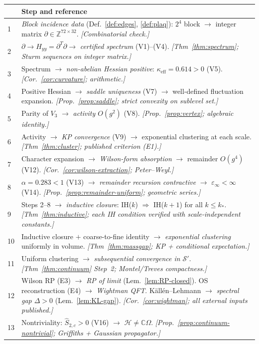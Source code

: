 \documentclass[11pt]{article}
\theoremstyle{definition}
\newcommand{\Z}{\mathbb{Z}}
\begin{document}
\begin{center}
\renewcommand{\arraystretch}{1.2}
\begin{tabular}{@{}p{0.5cm}p{12cm}@{}}
\toprule
& \textbf{Step and reference}\\
\midrule
1 & \emph{Block incidence data} (Def.~\ref{def:edges},
\ref{def:plaq}): $2^4$ block $\to$ integer matrix
$\partial\in\Z^{72\times 32}$. \emph{[Combinatorial check.]}\\
2 & $\partial\to H_{yy}=\partial^T\partial\to$
\emph{certified spectrum} (V1)--(V4).
\emph{[Thm~\ref{thm:spectrum}; Sturm sequences on
integer matrix.]}\\
3 & Spectrum $\to$ \emph{non-abelian Hessian positive}:
$\kappa_{\mathrm{eff}}=0.614>0$ (V5).
\emph{[Cor.~\ref{cor:curvature}; arithmetic.]}\\
4 & Positive Hessian $\to$ \emph{saddle uniqueness}
(V7) $\to$ well-defined fluctuation expansion.
\emph{[Prop.~\ref{prop:saddle}; strict convexity on
sublevel set.]}\\
5 & Parity of $V_3$ $\to$ \emph{activity $O(g^2)$}
(V8). \emph{[Prop.~\ref{prop:vertex}; algebraic
identity.]}\\
6 & Activity $\to$ \emph{KP convergence} (V9)
$\to$ exponential clustering at each scale.
\emph{[Thm~\ref{thm:cluster}; published criterion
(E1).]}\\
7 & Character expansion $\to$
\emph{Wilson-form absorption} $\to$ remainder $O(g^4)$
(V12). \emph{[Cor.~\ref{cor:wilson-extraction};
Peter--Weyl.]}\\
8 & $\alpha=0.283<1$ (V13) $\to$
\emph{remainder recursion contractive} $\to$
$\varepsilon_\infty<\infty$ (V14).
\emph{[Prop.~\ref{prop:remainder-uniform}; geometric
series.]}\\
9 & Steps 2--8 $\to$ \emph{inductive closure}:
IH($k$) $\Rightarrow$ IH($k+1$) for all $k\le k_*$.
\emph{[Thm~\ref{thm:inductive}; each IH condition
verified with scale-independent constants.]}\\
10 & Inductive closure $+$ coarse-to-fine identity
$\to$ \emph{exponential clustering} uniformly in volume.
\emph{[Thm~\ref{thm:massgap}; KP + conditional
expectation.]}\\
11 & Uniform clustering $\to$ \emph{subsequential
convergence in $\mathcal{S}'$}.
\emph{[Thm~\ref{thm:continuum} Step~2; Montel/Treves
compactness.]}\\
12 & Wilson RP (E3) $\to$ \emph{RP of limit}
(Lem.~\ref{lem:RP-closed}). OS reconstruction (E4) $\to$
\emph{Wightman QFT}. K\"all\'en--Lehmann $\to$
\emph{spectral gap $\Delta>0$}
(Lem.~\ref{lem:KL-gap}).
\emph{[Cor.~\ref{cor:wightman}; all external inputs
published.]}\\
13 & Nontriviality: $\hat S_{2,c}>0$ (V16) $\to$
$\mathcal{H}\ne\mathbb{C}\Omega$.
\emph{[Prop.~\ref{prop:continuum-nontrivial};
Griffiths + Gaussian propagator.]}\\
\bottomrule
\end{tabular}
\end{center}
\end{document}
